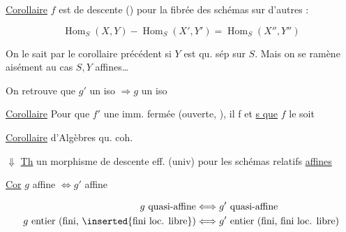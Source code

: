 \uline{Corollaire} $f$ est de descente () pour la  fibrée des schémas sur d'autres :

\[
 \operatorname{Hom}_S(X,Y)\mathrel{-}\operatorname{Hom}_S(X',Y')=\operatorname{Hom}_S(X'',Y'')
\]


On le sait par le corollaire précédent si $Y$ est qu. sép sur $S$. Mais on se ramène aisément au cas $S,Y$ affines\ldots

On retrouve que $g'$ un iso $\Rightarrow g$ un iso

\uline{Corollaire} Pour que $f'$ une imm. fermée (ouverte,  ), il f et \uline{s que} $f$ le soit


\uline{Corollaire}  d'Algèbres qu. coh.

$\Downarrow$  \uline{Th}   un morphisme de descente eff. (univ) pour les schémas relatifs \uline{affines}

\uline{Cor} $g$  affine $\Longleftrightarrow g'$ affine

\[
\begin{aligned}g\ \text{quasi-affine}&\Longleftrightarrow g'\ \text{quasi-affine}\\
 g\ \text{entier (fini, \inserted{fini loc. libre})}&\Longleftrightarrow g'\ \text{entier (fini, fini loc. libre)}
\end{aligned}
\]

\margin{[car $g$ qu. aff $\Longleftrightarrow g$ \unsure{qch|qu. cpt|coh.} et $X\mathrel{-}\operatorname{Spec}g_*(O_X)$ une imm}

